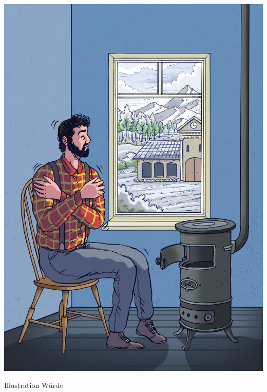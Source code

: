 \documentclass[justified,nobib,symmetric,twoside]{tufte-handout}
\begin{document}
\begin{marginfigure}[-0.1cm]
   \includegraphics[width=\linewidth]{figure_12.jpg}
   \caption{Illustration Würde}
   \label{fig:abbildung_12}
\end{marginfigure}
\end{document}
